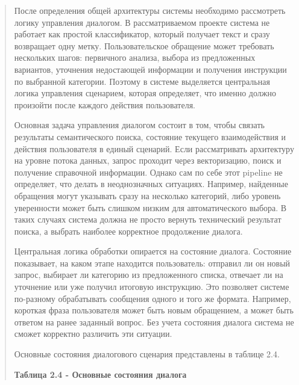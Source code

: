 \begin{quote}
После определения общей архитектуры системы необходимо рассмотреть
логику управления диалогом. В рассматриваемом проекте система не
работает как простой классификатор, который получает текст и сразу
возвращает одну метку. Пользовательское обращение может требовать
нескольких шагов: первичного анализа, выбора из предложенных вариантов,
уточнения недостающей информации и получения инструкции по выбранной
категории. Поэтому в системе выделяется центральная логика управления
сценарием, которая определяет, что именно должно произойти после каждого
действия пользователя.

Основная задача управления диалогом состоит в том, чтобы связать
результаты семантического поиска, состояние текущего взаимодействия и
действия пользователя в единый сценарий. Если рассматривать архитектуру
на уровне потока данных, запрос проходит через векторизацию, поиск и
получение справочной информации. Однако сам по себе этот pipeline не
определяет, что делать в неоднозначных ситуациях. Например, найденные
обращения могут указывать сразу на несколько категорий, либо уровень
уверенности может быть слишком низким для автоматического выбора. В
таких случаях система должна не просто вернуть технический результат
поиска, а выбрать наиболее корректное продолжение диалога.

Центральная логика обработки опирается на состояние диалога. Состояние
показывает, на каком этапе находится пользователь: отправил ли он новый
запрос, выбирает ли категорию из предложенного списка, отвечает ли на
уточнение или уже получил итоговую инструкцию. Это позволяет системе
по-разному обрабатывать сообщения одного и того же формата. Например,
короткая фраза пользователя может быть новым обращением, а может быть
ответом на ранее заданный вопрос. Без учета состояния диалога система не
сможет корректно различить эти ситуации.

Основные состояния диалогового сценария представлены в таблице 2.4.

\textbf{Таблица 2.4 - Основные состояния диалога}
\end{quote}

